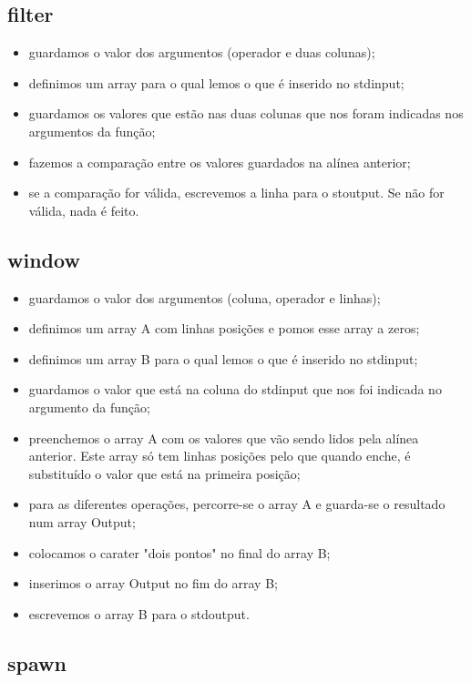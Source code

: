\documentclass[a4paper]{article}
\begin{document}
\subsection{filter}

\begin{itemize}
\item guardamos o valor dos argumentos (operador e duas colunas);
\item definimos um array para o qual lemos o que é inserido no stdinput;
\item guardamos os valores que estão nas duas colunas que nos foram indicadas nos argumentos da função;
\item fazemos a comparação entre os valores guardados na alínea anterior;
\item se a comparação for válida, escrevemos a linha para o stoutput. Se não for válida, nada é feito.
\end{itemize}

\subsection{window}

\begin{itemize}
\item guardamos o valor dos argumentos (coluna, operador e linhas);
\item definimos um array A com linhas posições e pomos esse array a zeros;
\item definimos um array B para o qual lemos o que é inserido no stdinput;
\item guardamos o valor que está na coluna do stdinput que nos foi indicada no argumento da função;
\item preenchemos o array A com os valores que vão sendo lidos pela alínea anterior. Este array só tem linhas posições pelo que quando enche, é substituído o valor que está na primeira posição;
\item para as diferentes operações, percorre-se o array A e guarda-se o resultado num array Output;
\item colocamos o carater "dois pontos" no final do array B;
\item inserimos o array Output no fim do array B;
\item escrevemos o array B para o stdoutput.

\end{itemize}

\subsection{spawn}
\end{document}
